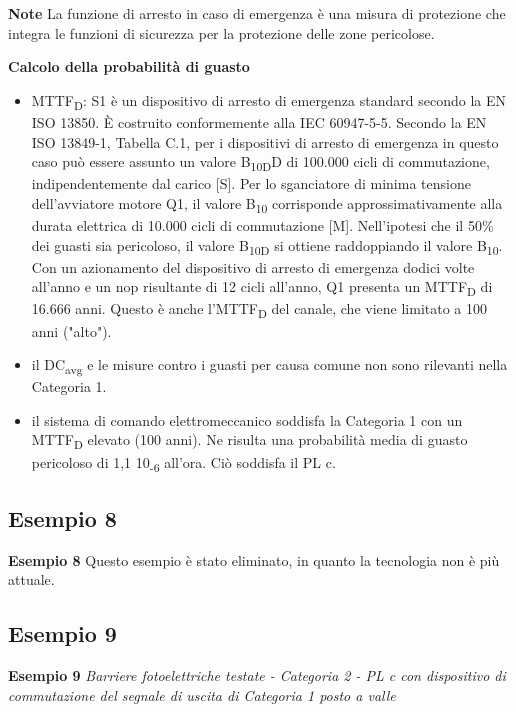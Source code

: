 \textbf{Note}
La funzione di arresto in caso di emergenza è una misura di protezione che integra le funzioni di sicurezza per la protezione delle zone pericolose.

\textbf{Calcolo della probabilità di guasto}
\begin{itemize}
    \item MTTF\textsubscript{D}: S1 è un dispositivo di arresto di emergenza standard secondo la EN ISO 13850. È costruito conformemente alla IEC 60947-5-5. Secondo la EN ISO 13849-1, Tabella C.1, per i dispositivi di arresto di emergenza in questo caso può essere assunto un valore B\textsubscript{10D}D di 100.000 cicli di commutazione, indipendentemente dal carico [S]. Per lo sganciatore di minima tensione dell'avviatore motore Q1, il valore B\textsubscript{10} corrisponde approssimativamente alla durata elettrica di 10.000 cicli di commutazione [M]. Nell'ipotesi che il 50\% dei guasti sia pericoloso, il valore B\textsubscript{10D} si ottiene raddoppiando il valore B\textsubscript{10}. Con un azionamento del dispositivo di arresto di emergenza dodici volte all'anno e un nop risultante di 12 cicli all'anno, Q1 presenta un MTTF\textsubscript{D} di 16.666 anni. Questo è anche l'MTTF\textsubscript{D} del canale, che viene limitato a 100 anni ("alto").
    \item il DC\textsubscript{avg} e le misure contro i guasti per causa comune non sono rilevanti nella Categoria 1.
    \item il sistema di comando elettromeccanico soddisfa la Categoria 1 con un MTTF\textsubscript{D} elevato (100 anni). Ne risulta una probabilità media di guasto pericoloso di 1,1 10\textsubscript{-6} all'ora. Ciò soddisfa il PL c.
\end{itemize}
\clearpage

\subsection{Esempio 8}
\label{sec:08-2-8}
\textbf{Esempio 8}
Questo esempio è stato eliminato, in quanto la tecnologia non è più attuale.
\clearpage

\subsection{Esempio 9}
\label{sec:08-2-9}
\textbf{Esempio 9}
\textit{Barriere fotoelettriche testate - Categoria 2 - PL c con dispositivo di commutazione del segnale di uscita di Categoria 1 posto a valle}

